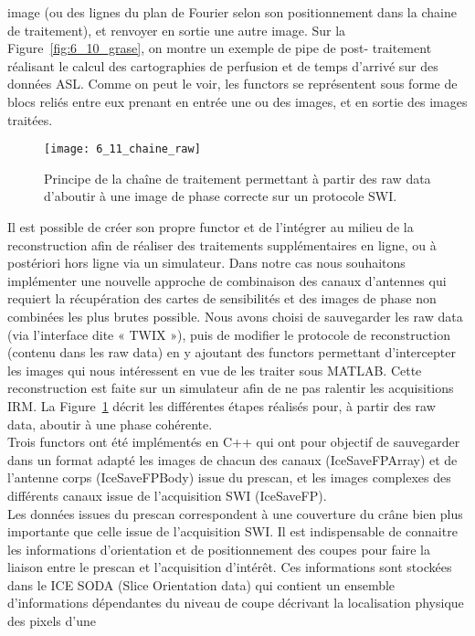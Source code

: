 {image (ou des lignes du plan de Fourier selon son positionnement dans la chaine de traitement), et
renvoyer en sortie une autre image. Sur la Figure~\ref{fig:6_10_grase}, on montre un exemple de pipe de post-
traitement réalisant le calcul des cartographies de perfusion et de temps d’arrivé sur des données ASL.
Comme on peut le voir, les functors se représentent sous forme de blocs reliés entre eux prenant en
entrée une ou des images, et en sortie des images traitées.\\
\begin{figure}[!b]
\centering
\texttt{[image: 6\_11\_chaine\_raw]}
\caption{Principe de la chaîne de traitement permettant à partir des raw data d’aboutir à une image de phase correcte sur
un protocole SWI.}
\label{fig:6_11_chaine_raw}	
\end{figure}
Il est possible de créer son propre functor et de l’intégrer au milieu de la reconstruction afin
de réaliser des traitements supplémentaires en ligne, ou à postériori hors ligne via un simulateur. Dans
notre cas nous souhaitons implémenter une nouvelle approche de combinaison des canaux d’antennes
qui requiert la récupération des cartes de sensibilités et des images de phase non combinées les plus
brutes possible. Nous avons choisi de sauvegarder les raw data (via l’interface dite « TWIX »), puis de
modifier le protocole de reconstruction (contenu dans les raw data) en y ajoutant des functors
permettant d’intercepter les images qui nous intéressent en vue de les traiter sous MATLAB. Cette
reconstruction est faite sur un simulateur afin de ne pas ralentir les acquisitions IRM. La Figure~\ref{fig:6_11_chaine_raw}
décrit les différentes étapes réalisés pour, à partir des raw data, aboutir à une phase cohérente.\\
Trois functors ont été implémentés en C++ qui ont pour objectif de sauvegarder dans un format
adapté les images de chacun des canaux (IceSaveFPArray) et de l’antenne corps (IceSaveFPBody) issue
du prescan, et les images complexes des différents canaux issue de l’acquisition SWI (IceSaveFP).\\
Les données issues du prescan correspondent à une couverture du crâne bien plus importante
que celle issue de l’acquisition SWI. Il est indispensable de connaitre les informations d’orientation et
de positionnement des coupes pour faire la liaison entre le prescan et l’acquisition d’intérêt. Ces
informations sont stockées dans le ICE SODA (Slice Orientation data) qui contient un ensemble
d’informations dépendantes du niveau de coupe décrivant la localisation physique des pixels d’une
}

